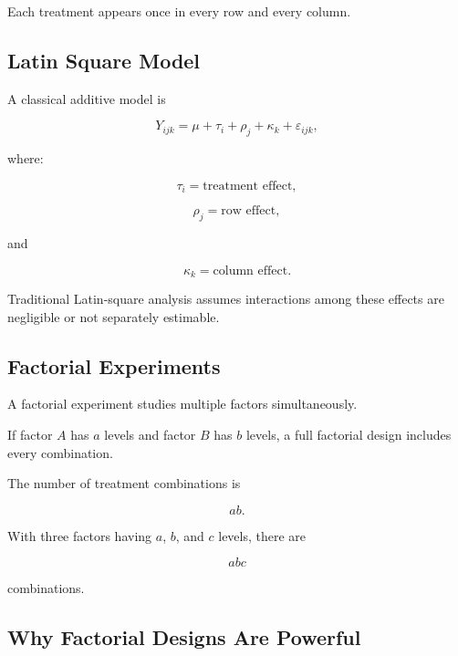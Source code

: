 Each treatment appears once in every row and every column.

\subsection{Latin Square Model}
\label{subsec:latin-square-model}

A classical additive model is

\[
\boxed{
Y_{ijk}
=
\mu
+
\tau_i
+
\rho_j
+
\kappa_k
+
\varepsilon_{ijk},
}
\]

where:

\[
\tau_i
=
\text{treatment effect},
\]

\[
\rho_j
=
\text{row effect},
\]

and

\[
\kappa_k
=
\text{column effect}.
\]

Traditional Latin-square analysis assumes interactions among these
effects are negligible or not separately estimable.

\subsection{Factorial Experiments}
\label{subsec:factorial-experiments}

A factorial experiment studies multiple factors simultaneously.

If factor \(A\) has \(a\) levels and factor \(B\) has \(b\) levels, a
full factorial design includes every combination.

The number of treatment combinations is

\[
\boxed{
ab.
}
\]

With three factors having \(a\), \(b\), and \(c\) levels, there are

\[
\boxed{
abc
}
\]

combinations.

\subsection{Why Factorial Designs Are Powerful}
\label{subsec:why-factorial-designs}

